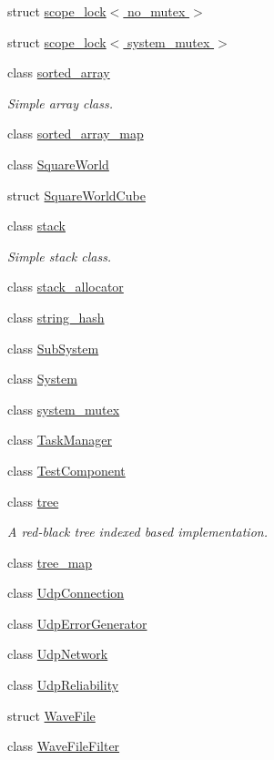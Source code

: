 \begin{DoxyCompactItemize}
\item 
struct \hyperlink{structcrap_1_1scope__lock_3_01no__mutex_01_4}{scope\+\_\+lock$<$ no\+\_\+mutex $>$}
\item 
struct \hyperlink{structcrap_1_1scope__lock_3_01system__mutex_01_4}{scope\+\_\+lock$<$ system\+\_\+mutex $>$}
\item 
class \hyperlink{classcrap_1_1sorted__array}{sorted\+\_\+array}
\begin{DoxyCompactList}\small\item\em Simple array class. \end{DoxyCompactList}\item 
class \hyperlink{classcrap_1_1sorted__array__map}{sorted\+\_\+array\+\_\+map}
\item 
class \hyperlink{classcrap_1_1_square_world}{Square\+World}
\item 
struct \hyperlink{structcrap_1_1_square_world_cube}{Square\+World\+Cube}
\item 
class \hyperlink{classcrap_1_1stack}{stack}
\begin{DoxyCompactList}\small\item\em Simple stack class. \end{DoxyCompactList}\item 
class \hyperlink{classcrap_1_1stack__allocator}{stack\+\_\+allocator}
\item 
class \hyperlink{classcrap_1_1string__hash}{string\+\_\+hash}
\item 
class \hyperlink{classcrap_1_1_sub_system}{Sub\+System}
\item 
class \hyperlink{classcrap_1_1_system}{System}
\item 
class \hyperlink{classcrap_1_1system__mutex}{system\+\_\+mutex}
\item 
class \hyperlink{classcrap_1_1_task_manager}{Task\+Manager}
\item 
class \hyperlink{classcrap_1_1_test_component}{Test\+Component}
\item 
class \hyperlink{classcrap_1_1tree}{tree}
\begin{DoxyCompactList}\small\item\em A red-\/black tree indexed based implementation. \end{DoxyCompactList}\item 
class \hyperlink{classcrap_1_1tree__map}{tree\+\_\+map}
\item 
class \hyperlink{classcrap_1_1_udp_connection}{Udp\+Connection}
\item 
class \hyperlink{classcrap_1_1_udp_error_generator}{Udp\+Error\+Generator}
\item 
class \hyperlink{classcrap_1_1_udp_network}{Udp\+Network}
\item 
class \hyperlink{classcrap_1_1_udp_reliability}{Udp\+Reliability}
\item 
struct \hyperlink{structcrap_1_1_wave_file}{Wave\+File}
\item 
class \hyperlink{classcrap_1_1_wave_file_filter}{Wave\+File\+Filter}
\end{DoxyCompactItemize}
